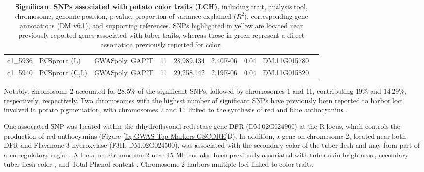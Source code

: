 \documentclass[pdflatex,sn-mathphys-ay]{sn-jnl}%
\begin{document}
\begin{landscape}
\begin{table}[ht]
\begin{tabular}{lllllllll}
c1\_5936                         & PCSprout (L)                            & GWASpoly, GAPIT                 & 11                       & 28,989,434                        & 2.40E-06                        & 0.04                        & DM.11G015780                        &                                                                              \\
c1\_5940                         & PCSprout (C,L)                          & GWASpoly, GAPIT                 & 11                       & 29,258,142                        & 2.19E-06                        & 0.04                        & DM.11G015820                        &       \\                                                                \hline      
\end{tabular}

\caption{\textbf{Significant SNPs associated with potato color traits (LCH)}, including trait, analysis tool, chromosome, genomic position, p-value, proportion of variance explained ($R^2$), corresponding gene annotations (DM v6.1), and supporting references. SNPs highlighted in yellow are located near previously reported genes associated with tuber traits, whereas those in green represent a direct association previously reported for color. }
    \label{tabsnps}
\end{table}
\end{landscape}


Notably, chromosome 2 accounted for 28.5\% of the significant SNPs, followed by chromosomes 1 and 11, contributing 19\% and 14.29\%, respectively, respectively. Two chromosomes with the highest number of significant SNPs have previously been reported to harbor loci involved in potato pigmentation, with chromosomes 2 and 11 linked to the synthesis of red and blue anthocyanins \citep{van1993identification,riveros2022uncovering}.

 










One associated SNP was located within the dihydroflavonol reductase gene DFR (DM.02G024900) at the R locus,  which controls the production of red anthocyanins \citep{de2003allele,riveros2022uncovering} (Figure \ref{fig:GWAS-Top-Markers-GSCORE}B). In addition, a gene on chromosome 2, located near both DFR and Flavanone-3-hydroxylase (F3H; DM.02G024500), was associated with the secondary color of the tuber flesh and may form part of a co-regulatory region. A locus on chromosome 2 near 45 Mb has also been previously associated with tuber skin brightness \citep{sharma2024genotyping}, secondary tuber flesh color \citep{Berdugo2017}, and Total Phenol content \citep{berdugo2023phenotypic}. Chromosome 2 harbors multiple loci linked to color traits.
\end{document}
